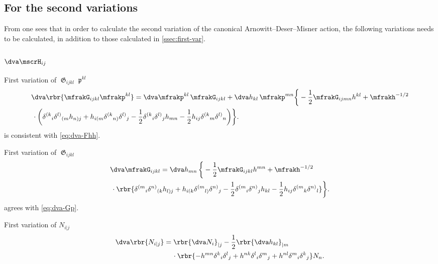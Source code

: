 \documentclass[a4paper,11pt]{article}
\begin{document}
\subsection{For the second variations}
\label{ssec:second-var}

From  one sees that in 
order to calculate the second variation of the canonical 
Arnowitt--Deser--Misner action, the following variations needs to be 
calculated, in addition to those calculated in \cref{ssec:first-var}.

\subsubsection{$\dva\mscrH_{ij}$}


First variation of $\mfrakG_{ijkl}\mfrakp^{kl}$
\begin{align}
&\dva\rbr{\mfrakG_{ijkl}\mfrakp^{kl}} =
\dva\mfrakp^{kl}\,\mfrakG_{ijkl}+\dva h_{kl}\,\mfrakp^{mn}
\bigg\{-\frac{1}{2}\mfrakG_{ijmn}h^{kl} + \mfrakh^{-1/2}
\nonumber \\
&\,\cdot\bigg(
\delta^{(k}{}_{i} \delta^{l)}{}_{(m} h_{n)j} +
h_{i(m} \delta^{(k}{}_{n)} \delta^{l)}{}_{j} - \frac{1}{2}
\delta^{(k}{}_{i} \delta^{l)}{}_{j} h_{mn} - \frac{1}{2}
h_{ij} \delta^{(k}{}_{m} \delta^{l)}{}_{n} \bigg)\bigg\}.
\label{eq:dva-Gp}
\end{align}
 is consistent with \cref{eq:dva-Fhh}.

First variation of $\mfrakG_{ijkl}$
\begin{align}
&\dva \mfrakG_{ijkl} = \dva h_{mn}\,\bigg\{ -\frac{1}{2}\mfrakG_{ijkl} h^{mn}
+ \mfrakh^{-1/2}
\nonumber \\
&\,\cdot\rbr{
\delta^{(m}{}_{i} \delta^{n)}{}_{(k} h_{l)j} +
h_{i(k} \delta^{(m}{}_{l)} \delta^{n)}{}_{j} - \frac{1}{2}
\delta^{(m}{}_{i} \delta^{n)}{}_{j} h_{kl} - \frac{1}{2}
h_{ij} \delta^{(m}{}_{k} \delta^{n)}{}_{l}}
\bigg\}.
\label{eq:dva-G}
\end{align}
 agrees with \cref{eq:dva-Gp}.

First variation of $N_{i|j}$
\begin{align}
\dva \rbr{N_{i|j}} &=
\rbr{\dva N_{i}}_{|j} -
\frac{1}{2} \rbr{\dva h_{kl}}_{|m}
\nonumber \\
&\quad\,\cdot \rbr{
- h^{mn} \delta^{k}{}_{i} \delta^{l}{}_{j}
+ h^{nk} \delta^{l}{}_{i} \delta^{m}{}_{j}
+ h^{nl} \delta^{m}{}_{i} \delta^{k}{}_{j}} N_n.
\end{align}
\end{document}
